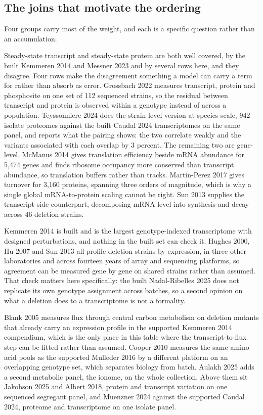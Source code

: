 \subsection{The joins that motivate the ordering}

Four groups carry most of the weight, and each is a specific question rather than an
accumulation.

 Steady-state
transcript and steady-state protein are both well covered, by the built Kemmeren 2014 and
Messner 2023 and by several rows here, and they disagree. Four rows make the disagreement
something a model can carry a term for rather than absorb as error. Grossbach 2022 measures
transcript, protein and phosphosite on one set of 112 sequenced strains, so the residual
between transcript and protein is observed within a genotype instead of across a
population. Teyssonniere 2024 does the strain-level version at species scale, 942 isolate
proteomes against the built Caudal 2024 transcriptomes on the same panel, and reports what
the pairing shows: the two correlate weakly and the variants associated with each overlap
by 3 percent. The remaining two are gene-level. McManus 2014 gives translation efficiency
beside mRNA abundance for 5,474 genes and finds ribosome occupancy more conserved than
transcript abundance, so translation buffers rather than tracks. Martin-Perez 2017 gives
turnover for 3,160 proteins, spanning three orders of magnitude, which is why a single
global mRNA-to-protein scaling cannot be right. Sun 2013 supplies the transcript-side
counterpart, decomposing mRNA level into synthesis and decay across 46 deletion strains.

 Kemmeren 2014 is built
and is the largest genotype-indexed transcriptome with designed perturbations, and nothing
in the built set can check it. Hughes 2000, Hu 2007 and Sun 2013 all profile deletion
strains by expression, in three other laboratories and across fourteen years of array and
sequencing platforms, so agreement can be measured gene by gene on shared strains rather
than assumed. That check matters here specifically: the built Nadal-Ribelles 2025 does not
replicate its own genotype assignment across batches, so a second opinion on what a
deletion does to a transcriptome is not a formality.

 Blank 2005 measures flux
through central carbon metabolism on deletion mutants that already carry an expression
profile in the supported Kemmeren 2014 compendium, which is the only place in this table
where the transcript-to-flux step can be fitted rather than assumed. Cooper 2010 measures
the same amino-acid pools as the supported Mulleder 2016 by a different platform on an
overlapping genotype set, which separates biology from batch. Aulakh 2025 adds a second
metabolic panel, the ionome, on the whole collection. Above them sit Jakobson 2025 and
Albert 2018, protein and transcript variation on one sequenced segregant panel, and
Muenzner 2024 against the supported Caudal 2024, proteome and transcriptome on one isolate
panel.

